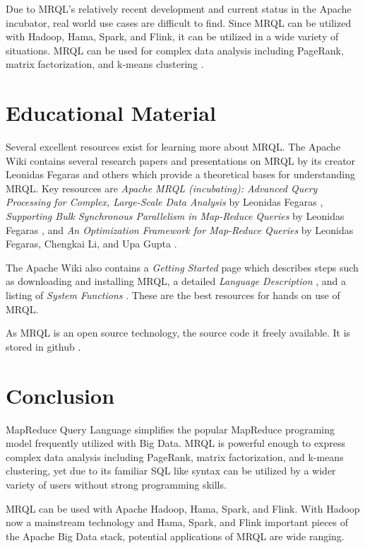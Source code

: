 \documentclass[9pt,twocolumn,twoside]{../../styles/osajnl}
\begin{document}
Due to MRQL's relatively recent development and current status in the Apache incubator, real world use cases are difficult to find.  Since MRQL can be utilized with Hadoop, Hama, Spark, and Flink, it can be utilized in a wide variety of situations.  MRQL can be used for complex data analysis including PageRank, matrix factorization, and k-means clustering \cite{www-apacheincubator}.

\section{Educational Material}

Several excellent resources exist for learning more about MRQL.  The Apache Wiki contains several research papers and presentations on MRQL by its creator Leonidas Fegaras and others \cite{www-wikiapache} which provide a theoretical bases for understanding MRQL.  Key resources are \emph{Apache MRQL (incubating): Advanced Query Processing for Complex, Large-Scale Data Analysis} by Leonidas Fegaras \cite{www-mrqpresent}, \emph{Supporting Bulk Synchronous Parallelism in Map-Reduce Queries} by Leonidas Fegaras \cite{wikibsp}, and \emph{An Optimization Framework for Map-Reduce Queries} by Leonidas Fegaras, Chengkai Li, and Upa Gupta \cite{wikiopt}.



The Apache Wiki also contains a \emph{Getting Started} page \cite{www-wikiastart} which describes steps such as downloading and installing MRQL, a detailed \emph{Language Description} \cite{www-wikilanguage}, and a listing of \emph{System Functions} \cite{www-wikifunctions}.  These are the best resources for hands on use of MRQL.

As MRQL is an open source technology, the source code it freely available.  It is stored in github \cite{www-gitmrql}.


\section{Conclusion}

MapReduce Query Language simplifies the popular MapReduce programing model frequently utilized with Big Data.  MRQL is powerful enough to express complex data analysis including PageRank, matrix factorization, and k-means clustering, yet due to its familiar SQL like syntax can be utilized by a wider variety of users without strong programming skills.

MRQL can be used with Apache Hadoop, Hama, Spark, and Flink. With Hadoop now a mainstream technology and Hama, Spark, and Flink important pieces of the Apache Big Data stack, potential applications of MRQL are wide ranging.
\end{document}
